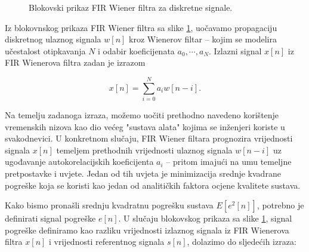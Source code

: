 \documentclass[a4paper,12pt,oneside]{memoir}
\begin{document}
                \begin{figure}[H]
                    \centering
                    \caption{Blokovski prikaz FIR Wiener filtra za diskretne signale.}
                    \label{fig:U5}
                \end{figure}
                Iz blokovnskog prikaza FIR Wiener filtra sa slike \ref{fig:U5}, uočavamo propagaciju diskretnog ulaznog signala $w[n]$ kroz Wienerov filtar -- kojim se modelira učestalost otipkavanja $N$ i odabir koeficijenata ${a_0,\dotsm,a_N}$. Izlazni signal $x[n]$ iz FIR Wienerova filtra zadan je izrazom

                \begin{equation}
                    x[n]=\displaystyle\sum_{i=0}^{N}a_i w[n-i].
                \end{equation}

                Na temelju zadanoga izraza, možemo uočiti prethodno navedeno korištenje vremenskih nizova kao dio većeg "sustava alata" kojima se inženjeri koriste u svakodnevici. U konkretnom slučaju, FIR Wiener filtara prognozira vrijednosti signala $x[n]$ temeljem prethodnih vrijednosti ulaznog signala $w[n-i]$ uz ugođavanje autokorelacijskih koeficijenta $a_i$ -- pritom imajući na umu temeljne pretpostavke i uvjete. Jedan od tih uvjeta je minimizacija srednje kvadrane pogreške koja se koristi kao jedan od analitičkih faktora ocjene kvalitete sustava.

                Kako bismo pronašli srednju kvadratnu pogrešku sustava $E[e^2[n]]$, potrebno je definirati signal pogreške $e[n]$. U slučaju blokovskog prikaza sa slike \ref{fig:U5}, signal pogreške definiramo kao razliku vrijednosti izlaznog signala iz FIR Wienerova filtra $x[n]$ i vrijednosti referentnog signala $s[n]$, dolazimo do sljedećih izraza:
\end{document}
